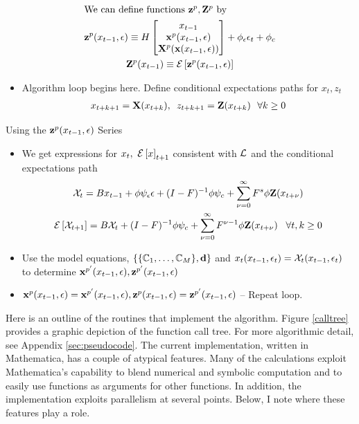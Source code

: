 \documentclass[12pt]{article}
\begin{document}
\begin{gather*}
 \intertext{We can define functions $\mathbf{z}^p,\mathbf{Z}^p$ by}
\mathbf{z}^p(x_{t-1},\epsilon)\equiv H
\begin{bmatrix}
x_{t-1}\\ \mathbf{x}^p(x_{t-1},\epsilon)\\ \mathbf{X}^p(\mathbf{x}(x_{t-1},\epsilon))
\end{bmatrix}+\phi_\epsilon \epsilon_t+\phi_c\\
\mathbf{Z}^p(x_{t-1})\equiv {\mathcal{E}\left [  \mathbf{z}^p(x_{t-1},\epsilon)\right ]}
\end{gather*}
 \begin{itemize}
\item  {\color{blue}Algorithm loop begins here.} Define conditional expectations paths for $x_t, z_t$ 
 \begin{gather*}
 x_{t+k+1}=\mathbf{X}(x_{t+k}),\,\,\,z_{t+k+1}=\mathbf{Z}(x_{t+k})\,\,\,\,  \forall k\ge 0      \end{gather*}
   \end{itemize}

{Using the $\mathbf{z}^p(x_{t-1},\epsilon)$ Series}
{\small
  \begin{itemize}
  \item We get expressions for $x_t,\,\, {\mathcal{E}\left [ x \right ]}_{t+1}$ consistent with ${\mathcal{L}}$ and the conditional expectations path
   \begin{gather*}
     \mathcal{X}_{t} =B x_{t-1}+ \phi \psi_\epsilon\epsilon + (I - F)^{-1} \phi \psi_c + \sum_{{\nu}=0}^\infty F^s \phi \mathbf{Z}(x_{t+\nu})\\
	{\mathcal{E}\left [  \mathcal{X}_{t+1} \right ]} =B \mathcal{X}_{t}  + (I - F)^{-1} \phi \psi_c+ \sum_{{\nu} =0}^\infty F^{{\nu}-1} \phi \mathbf{Z}(x_{t+\nu}) \,\,\,\,\,\forall t,k \ge  0
\end{gather*}
\item Use the model equations, $\{\{\mathbb{C}_{1},\ldots,\mathbb{C}_{M}\},\mathbf{d}\}$ and $x_t(x_{t-1},\epsilon_t)=\mathcal{X}_t(x_{t-1},\epsilon_t)$\\ to determine $\mathbf{x}^{p'}(x_{t-1},\epsilon), \mathbf{z}^{p'}(x_{t-1},\epsilon)$
\item $\mathbf{x}^p(x_{t-1},\epsilon)=\mathbf{x}^{p'}(x_{t-1},\epsilon), \mathbf{z}^p(x_{t-1},\epsilon)=\mathbf{z}^{p'}(x_{t-1},\epsilon)$ -- {\color{blue}Repeat loop.}
  \end{itemize}
}

Here is an outline of the routines that implement the algorithm. 
Figure \ref{calltree}
provides a graphic depiction of the function call tree. For more algorithmic detail, see Appendix \ref{sec:pseudocode}. 
The current implementation, written in  Mathematica,
  has a couple of atypical features.  
Many of the calculations exploit Mathematica's capability to blend
numerical and symbolic computation and to easily use functions as arguments for
other functions.  In addition, the implementation exploits parallelism at
several points. Below, I note where these features play a role.
\end{document}
